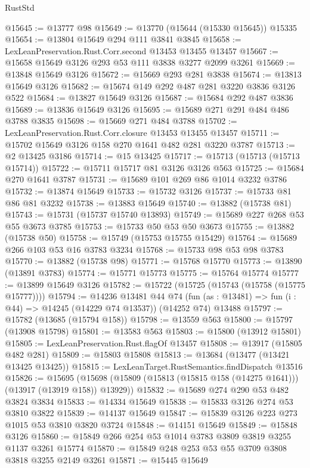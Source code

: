 \begin{lexlean}{RustStd}
\begin{coremodule}
@15645 := @13777 @98
@15649 := @13770 (@15644 (@15330 @15645)) @15335
@15654 := @13804 @15649 @294 @111 @3841 @3845
@15658 := LexLeanPreservation.Rust.Corr.second @13453 @13455 @13457
@15667 := @15658 @15649 @3126 @293 @53 @111 @3838 @3277 @2099 @3261
@15669 := @13848 @15649 @3126
@15672 := @15669 @293 @281 @3838
@15674 := @13813 @15649 @3126
@15682 := @15674 @149 @292 @487 @281 @3220 @3836 @3126 @522
@15684 := @13827 @15649 @3126
@15687 := @15684 @292 @487 @3836
@15689 := @13836 @15649 @3126
@15695 := @15689 @271 @291 @484 @486 @3788 @3835
@15698 := @15669 @271 @484 @3788
@15702 := LexLeanPreservation.Rust.Corr.closure @13453 @13455 @13457
@15711 := @15702 @15649 @3126 @158 @270 @1641 @482 @281 @3220 @3787
@15713 := @2 @13425 @3186
@15714 := @15 @13425
@15717 := @15713 (@15713 (@15713 @15714))
@15722 := @15711 @15717 @81 @3126 @3126 @563
@15725 := @15684 @270 @1641 @3787
@15731 := @15689 @101 @269 @86 @1014 @3232 @3786
@15732 := @13874 @15649
@15733 := @15732 @3126
@15737 := @15733 @81 @86 @81 @3232
@15738 := @13883 @15649
@15740 := @13882 (@15738 @81)
@15743 := @15731 (@15737 @15740 @13893)
@15749 := @15689 @227 @268 @53 @55 @3673 @3785
@15753 := @15733 @50 @53 @50 @3673
@15755 := @13882 (@15738 @50)
@15758 := @15749 (@15753 @15755 @15429)
@15764 := @15689 @266 @103 @53 @16 @3783 @3234
@15768 := @15733 @98 @53 @98 @3783
@15770 := @13882 (@15738 @98)
@15771 := @15768 @15770
@15773 := @13890 (@13891 @3783)
@15774 := @15771 @15773
@15775 := @15764 @15774
@15777 := @13899 @15649 @3126
@15782 := @15722 (@15725 (@15743 (@15758 (@15775 @15777))))
@15794 := @14236
    @13481
    @44
    @74
    (fun (as : @13481) => fun (i : @44) => @14245 (@14229 @74 @13537))
    (@14252 @74)
    @13488
@15797 := @15782 (@13685 (@15794 @158))
@15798 := @13559 @563
@15800 := @15797 (@13908 @15798)
@15801 := @13583 @563
@15803 := @15800 (@13912 @15801)
@15805 := LexLeanPreservation.Rust.flagOf @13457
@15808 := @13917 (@15805 @482 @281)
@15809 := @15803 @15808
@15813 := @13684 (@13477 (@13421 @13425 @13425))
@15815 := LexLeanTarget.RustSemantics.findDispatch @13516
@15826 := @15695
    (@15698 (@15809 (@15813 (@15815 @158 (@14275 @1641))) (@13917 (@13919 @158)) @13929))
@15832 := @15689 @274 @290 @53 @482 @3824 @3834
@15833 := @14334 @15649
@15838 := @15833 @3126 @274 @53 @3810 @3822
@15839 := @14137 @15649
@15847 := @15839 @3126 @223 @273 @1015 @53 @3810 @3820 @3724
@15848 := @14151 @15649
@15849 := @15848 @3126
@15860 := @15849 @266 @254 @53 @1014 @3783 @3809 @3819 @3255 @1137 @3261 @15774
@15870 := @15849 @248 @253 @53 @55 @3709 @3808 @3818 @3255 @2149 @3261
@15871 := @15445 @15649

\end{coremodule}
\end{lexlean}
